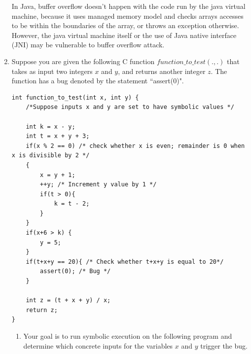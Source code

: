 \documentclass[12pt,a4paper]{article}
\begin{document}
\begin{enumerate}
In Java, buffer overflow doesn't happen with the code run by the java virtual machine, because it uses managed memory model and checks arrays accesses to be within the boundaries of the array, or throws an exception otherwise. However, the java virtual machine itself or  the use of Java native interface (JNI) may be vulnerable to buffer overflow attack. 

\color{black}

\item Suppose you are given the following C function $function\_to\_test (.,.)$ that
takes as input two integers $x$ and $y$, and returns another integer $z$. The function has a
bug denoted by the statement ``assert(0)".


\begin{lstlisting} 
int function_to_test(int x, int y) {
	/*Suppose inputs x and y are set to have symbolic values */
	
	int k = x - y;
	int t = x + y + 3;
	if(x % 2 == 0) /* check whether x is even; remainder is 0 when x is divisible by 2 */
	{
		x = y + 1;
		++y; /* Increment y value by 1 */
		if(t > 0){
			k = t - 2;
		}
	}	
	if(x+6 > k) {
		y = 5;
	}
	if(t+x+y == 20){ /* Check whether t+x+y is equal to 20*/
		assert(0); /* Bug */
	}
	
	int z = (t + x + y) / x; 
	return z;
}
\end{lstlisting}

\begin{enumerate}
\item Your goal is to run symbolic execution on the following program and determine which concrete inputs for the variables $x$ and $y$ trigger the bug.

\color{blue}


\end{enumerate}
\end{enumerate}
\end{document}
